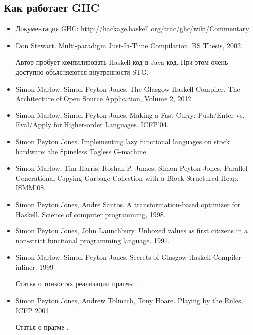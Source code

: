 \subsection{Как работает GHC}

\begin{itemize}
\item Документация GHC:
\url{http://hackage.haskell.org/trac/ghc/wiki/Commentary}

\item Don Stewart. Multi-paradigm Just-In-Time Compilation. BS Thesis, 2002.

    Автор пробует компилировать Haskell-код в Java-код. При этом
    очень доступно объясняеются внутренности STG. 

\item Simon Marlow, Simon Peyton Jones. The Glasgow Haskell Compiler. 
    The Architecture of Open Source Application, Volume 2, 2012.

\item Simon Marlow, Simon Peyton Jones. Making a Fast Curry: Push/Enter vs.
    Eval/Apply for Higher-order Languages. ICFP'04.

\item Simon Peyton Jones. Implementing lazy functional languages
on stock hardware: the Spineless Tagless G-machine.

\item Simon Marlow, Tim Harris, Roshan P. James, Simon Peyton Jones.
    Parallel Generational-Copying Garbage Collection with a 
    Block-Structured Heap. ISMM'08.

\item Simon Peyton Jones, Andre Santos. 
    A transformation-based optimizer for Haskell.
    Science of computer programming, 1998.

\item Simon Peyton Jones, John Launchbury. 
    Unboxed values as first citizens in a non-strict 
    functional programming language. 1991.

\item Simon Marlow, Simon Peyton Jones. 
    Secrets of Glasgow Haskell Compiler inliner. 1999

    Статья о тонкостях реализации прагмы .

\item Simon Peyton Jones, Andrew Tolmach, Tony Hoare.
    Playing by the Rules, ICFP 2001

    Статья о прагме .
\end{itemize}


